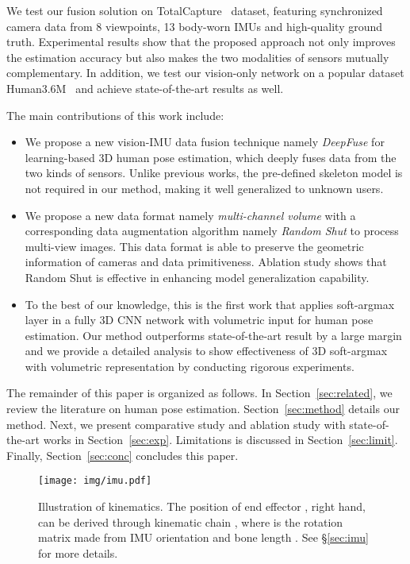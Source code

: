 \documentclass[10pt,twocolumn,letterpaper]{article}
\begin{document}
We test our fusion solution on TotalCapture~\cite{trumble2017total} dataset, featuring synchronized camera data from 8 viewpoints, 13 body-worn IMUs and high-quality ground truth. Experimental results show that the proposed approach not only improves the estimation accuracy but also makes the two modalities of sensors mutually complementary. 
In addition, we test our vision-only network on a popular dataset Human3.6M~\cite{h36m_pami} and achieve state-of-the-art results as well. 

The main contributions of this work include:
\vspace{-5pt}
\begin{itemize}
\item We propose a new vision-IMU data fusion technique namely \emph{DeepFuse} for learning-based 3D human pose estimation, which deeply fuses data from the two kinds of sensors. Unlike previous works, the pre-defined skeleton model is not required in our method, making it well generalized to unknown users. 
\vspace{-3pt}
\item We propose a new data format namely \emph{multi-channel volume} with a corresponding data augmentation algorithm namely \emph{Random Shut} to process multi-view images. This data format is able to preserve the geometric information of cameras and data primitiveness. Ablation study shows that Random Shut is effective in enhancing model generalization capability.
\vspace{-3pt}
\item To the best of our knowledge, this is the first work that applies soft-argmax layer in a fully 3D CNN network with volumetric input for human pose estimation. Our method outperforms state-of-the-art result by a large margin and we provide a detailed analysis to show effectiveness of 3D soft-argmax with volumetric representation by conducting rigorous experiments.
\vspace{-3pt}
\end{itemize}

The remainder of this paper is organized as follows. In Section~\ref{sec:related}, we review the literature on human pose estimation. Section~\ref{sec:method} details our method. Next, we present comparative study and ablation study with state-of-the-art works in Section~\ref{sec:exp}. Limitations is discussed in Section~\ref{sec:limit}. Finally, Section~\ref{sec:conc} concludes this paper.

\begin{figure}
\begin{center}
\texttt{[image: img/imu.pdf]}
\end{center}
    \vspace{-0.6cm}
   \caption{Illustration of kinematics. The position of end effector , right hand, can be derived through kinematic chain , where  is the rotation matrix made from IMU orientation  and bone length . See \S\ref{sec:imu} for more details.}
\label{fig:skeleton}
\vspace*{-14pt}
\end{figure}
\end{document}

